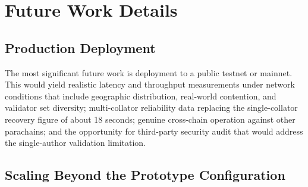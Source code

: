 
\chapter{Future Work Details}\label{app:future-work}

\section{Production Deployment}\label{sec:e-production}

The most significant future work is deployment to a public testnet or mainnet. This would yield realistic latency and throughput measurements under network conditions that include geographic distribution, real-world contention, and validator set diversity; multi-collator reliability data replacing the single-collator recovery figure of about 18 seconds; genuine cross-chain operation against other parachains; and the opportunity for third-party security audit that would address the single-author validation limitation.

\section{Scaling Beyond the Prototype Configuration}\label{sec:e-polkadot-2}

